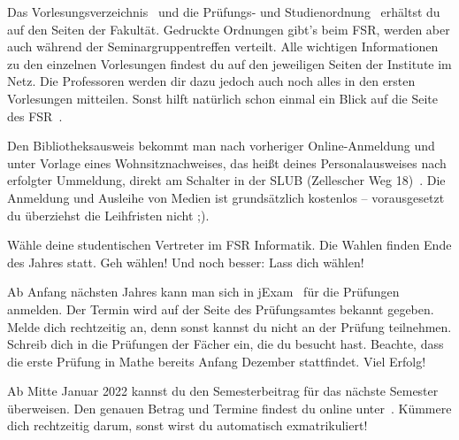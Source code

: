 \begin{itemize}[leftmargin=*]
Das Vorlesungsverzeichnis~ und die Prüfungs- und
Studienordnung~ erhältst du
auf den Seiten der Fakultät. Gedruckte Ordnungen gibt's beim FSR, werden aber auch während der Seminargruppentreffen verteilt.
Alle wichtigen Informationen zu den einzelnen Vorlesungen findest du
auf den jeweiligen Seiten der Institute im Netz.  Die Professoren werden dir
dazu jedoch auch noch alles in den ersten Vorlesungen mitteilen. Sonst hilft
natürlich schon einmal ein Blick auf die Seite des FSR~.

Den Bibliotheksausweis bekommt man nach vorheriger Online-Anmeldung und unter Vorlage eines
Wohnsitznachweises, das heißt deines Personalausweises nach erfolgter Ummeldung,
direkt am Schalter in der SLUB (Zellescher Weg 18)~. Die Anmeldung und Ausleihe
von Medien ist grundsätzlich kostenlos -- vorausgesetzt du überziehst die
Leihfristen nicht ;).


Wähle deine studentischen Vertreter im FSR Informatik. Die Wahlen finden Ende des Jahres statt. Geh wählen! Und noch besser: Lass dich wählen!


Ab Anfang nächsten Jahres kann man sich in jExam~ für die Prüfungen anmelden.
Der Termin wird auf der Seite des Prüfungsamtes bekannt gegeben. Melde dich
rechtzeitig an, denn sonst kannst du nicht an der Prüfung teilnehmen. Schreib
dich in die Prüfungen der Fächer ein, die du besucht hast. Beachte, dass die
erste Prüfung in Mathe bereits Anfang Dezember stattfindet. Viel Erfolg!

Ab Mitte Januar 2022 kannst du den Semesterbeitrag für das nächste Semester
überweisen. Den genauen Betrag und Termine findest du online unter~. Kümmere dich rechtzeitig darum,
sonst wirst du automatisch exmatrikuliert!

\end{itemize}

\vfill

